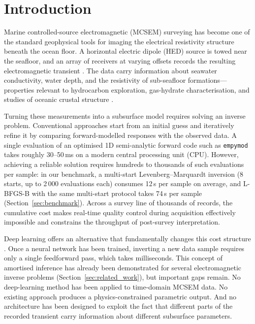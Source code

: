 \documentclass[journal]{IEEEtran}
\begin{document}
\section{Introduction}
\label{sec:intro}

Marine controlled-source electromagnetic (MCSEM) surveying has become
one of the standard geophysical tools for imaging the electrical
resistivity structure beneath the ocean floor. A horizontal electric
dipole (HED) source is towed near the seafloor, and an array of
receivers at varying offsets records the resulting electromagnetic
transient \citep{constable2006, constable2010ten}. The data carry
information about seawater conductivity, water depth, and the
resistivity of sub-seafloor formations---properties relevant to
hydrocarbon exploration, gas-hydrate characterisation, and studies of
oceanic crustal structure \citep{key2012marine}.

Turning these measurements into a subsurface model requires solving
an inverse problem. Conventional approaches start from an initial
guess and iteratively refine it by comparing forward-modelled
responses with the observed data. A single evaluation of an optimised
1D semi-analytic forward code such as \texttt{empymod}
\citep{werthmullerEmpymod} takes roughly 30--50\,ms on a modern
central processing unit (CPU). However, achieving a reliable solution requires hundreds to
thousands of such evaluations per sample: in our benchmark, a
multi-start Levenberg--Marquardt inversion (8 starts, up to
2\,000 evaluations each) consumes 12\,s per sample on average, and
L-BFGS-B with the same multi-start protocol takes 74\,s per sample
(Section~\ref{sec:benchmark}). Across a survey line of thousands of
records, the cumulative cost makes real-time quality control during
acquisition effectively impossible and constrains the throughput of
post-survey interpretation.

Deep learning offers an alternative that fundamentally changes this
cost structure \citep{lecun2015deep, reichstein2019deep}. Once a
neural network has been trained, inverting a new data sample requires
only a single feedforward pass, which takes milliseconds. This
concept of amortised inference has already been demonstrated for
several electromagnetic inverse problems
(Section~\ref{sec:related_work}), but important gaps remain. No
deep-learning method has been applied to time-domain MCSEM data. No
existing approach produces a physics-constrained parametric output.
And no architecture has been designed to exploit the fact that
different parts of the recorded transient carry information about
different subsurface parameters.
\end{document}
